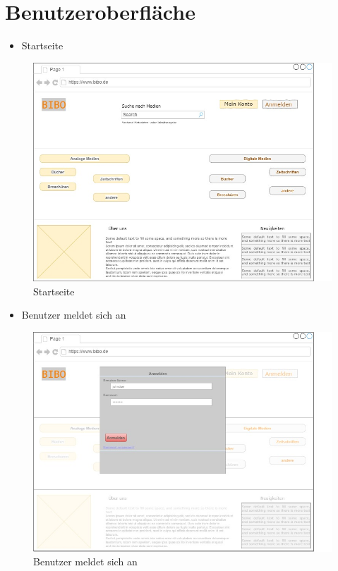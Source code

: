 \documentclass[12pt, a4paper]{article}
\begin{document}
\section{Benutzeroberfläche}
\begin{itemize}
	\item Startseite
\end{itemize}
\begin{figure}[h]
	\includegraphics[width=\textwidth]{GUIs/startseite.jpg}
	\caption{Startseite}
	\label{fig:startseite}
\end{figure}
\pagebreak
\begin{itemize}
	\item Benutzer meldet sich an
\end{itemize}
\begin{figure}[h]
	\includegraphics[width=\textwidth]{GUIs/anmelden.jpg}
	\caption{Benutzer meldet sich an}
	\label{fig:anmeldung}
\end{figure}
\end{document}
